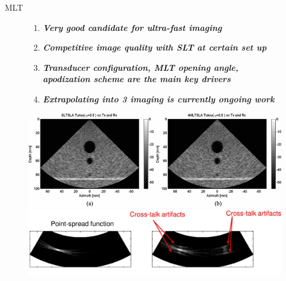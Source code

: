 \documentclass[t,12pt,english
\ifx\beamermode\undefined\else,\beamermode\fi
]{beamer}
\begin{document}
\begin{frame}{MLT}

\begin{figure}[!htb]
\begin{block}{\footnotesize{\tiny }}\tiny{}
\begin{enumerate} 
\vspace{0.05cm}

     \item \tiny{\textbf{\textit{Very good candidate for ultra-fast imaging}}}
     \item \tiny{\textbf{\textit{Competitive image quality with SLT at certain set up}}}
     \item \tiny{\textbf{\textit{Transducer configuration, MLT opening angle, apodization scheme are the main key drivers}}}
     \item \tiny{\textbf{\textit{Extrapolating into 3 imaging is currently ongoing work}}}

\end{enumerate}
\end{block}
\endminipage
{}
\centering
\includegraphics[width=1\textwidth]{MLAresults3.jpg}\\
\includegraphics[width=1\textwidth]{PSF.jpg}\\
\endminipage
\end{figure}

\end{frame}
\end{document}
